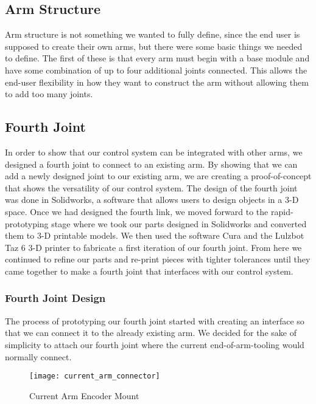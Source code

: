 \subsection{Arm Structure}
Arm structure is not something we wanted to fully define, since the end user is supposed to create their own arms, but there were some basic things we needed to define. The first of these is that every arm must begin with a base module and have some combination of up to four additional joints connected.  This allows the end-user flexibility in how they want to construct the arm without allowing them to add too many joints.

\subsection{Fourth Joint}
In order to show that our control system can be integrated with other arms, we designed a fourth joint to connect to an existing arm. By showing that we can add a newly designed joint to our existing arm, we are creating a proof-of-concept that shows the versatility of our control system.  The design of the fourth joint was done in Solidworks, a software that allows users to design objects in a 3-D space. Once we had designed the fourth link, we moved forward to the rapid-prototyping stage where we took our parts designed in Solidworks and converted them to 3-D printable models.  We then used the software Cura and the Lulzbot Taz 6 3-D printer to fabricate a first iteration of our fourth joint.  From here we continued to refine our parts and re-print pieces with tighter tolerances until they came together to make a fourth joint that interfaces with our control system.

\subsubsection{Fourth Joint Design}
The process of prototyping our fourth joint started with creating an interface so that we can connect it to the already existing arm.  We decided for the sake of simplicity to attach our fourth joint where the current end-of-arm-tooling would normally connect. \\

\begin{figure}[H]
	\centering
	\texttt{[image: current\_arm\_connector]}
	\caption{Current Arm Encoder Mount}
	\label{Current Arm Encoder Mount}
\end{figure}

